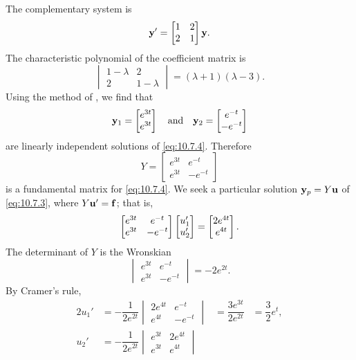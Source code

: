 \begin{alistSolution}
\item The complementary system is
\begin{equation} \label{eq:10.7.4}
\mathbf{y}'=\begin{bmatrix}1&2\\2&1\end{bmatrix}\mathbf{y}.
\end{equation}
The characteristic polynomial of the coefficient matrix is
\[
\begin{vmatrix}1-\lambda&2\\2&1-\lambda\end{vmatrix}=
(\lambda+1)(\lambda-3).
\]
Using the method of , we find that
\[
\mathbf{y}_1=\begin{bmatrix}e^{3t}\\e^{3t}\end{bmatrix}
\quad\text{and}\quad 
\mathbf{y}_2=\begin{bmatrix}e^{-t}\\-e^{-t}\end{bmatrix}
\]
are linearly independent solutions of \eqref{eq:10.7.4}.
Therefore
\[
Y=\begin{bmatrix}e^{3t}&e^{-t}\\e^{3t}&-e^{-t}\end{bmatrix}
\]
is a fundamental matrix for \eqref{eq:10.7.4}. We seek a particular
solution $\mathbf{y}_p=Y\mathbf{u}$ of \eqref{eq:10.7.3}, where $Y\mathbf{u}'=\mathbf{f}$; that is,
\[
\begin{bmatrix}e^{3t}&e^{-t}\\e^{3t}&-e^{-t}\end{bmatrix}
\begin{bmatrix}u_1'\\u_2'\end{bmatrix}
=\begin{bmatrix}2e^{4t}\\e^{4t}\end{bmatrix}.
\]
The determinant of $Y$ is the Wronskian
\[
\begin{vmatrix}e^{3t}&e^{-t}\\e^{3t}&-e^{-t}\end{vmatrix}
=-2e^{2t}.
\]
By Cramer's rule,
\begin{alignat*}{2}
u_1'&=-\dfrac{1}{2e^{2t}}
\begin{vmatrix}2e^{4t}&e^{-t}\\e^{4t}&-e^{-t}\end{vmatrix}
&{}=\dfrac{3e^{3t}}{2e^{2t}}
&=\dfrac{3}{2}e^t,\\
u_2'&=-\dfrac{1}{2e^{2t}}
\begin{vmatrix}e^{3t}&2e^{4t}\\e^{3t}&e^{4t}\end{vmatrix}

\end{alignat*}
\end{alistSolution}

